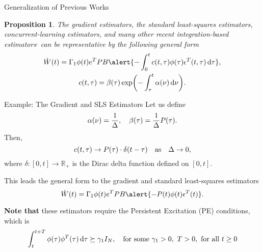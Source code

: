 \documentclass[]{beamer}
\theoremstyle{plain}
\newtheorem{proposition}{Proposition}
\theoremstyle{definition}
\theoremstyle{remark}
\newcommand{\MB}[1]{\mathbb{#1}}
\begin{document}
\begin{frame}{Generalization of Previous Works}
	\begin{proposition}
		The gradient estimators, the standard least-squares
		estimators, concurrent-learning
		estimators, and many other recent
		integration-based estimators$^,$
		 can be representative by the following
		general form
		\begin{gather*}
			\dot{W}(t) = \Gamma_1 \phi(t) e^T P B \alert{- \int_0^t c(t, \tau)
			\phi(\tau) \epsilon^T(t, \tau) \dd{\tau}}, \\
			c(t,\tau) = \beta(\tau) \exp(- \int_\tau^t \alpha(\nu) \dd{\nu}).
		\end{gather*}
	\end{proposition}
\end{frame}

\begin{frame}{Example: The Gradient and SLS Estimators}
	Let us define
	\begin{equation*}
		\alpha(\nu) = \frac{1}{\Delta} \qc \beta(\tau) = \frac{1}{\Delta}
		P(\tau).
	\end{equation*}
	\pause
	Then,
	\begin{equation*}
		c(t, \tau) \to P(\tau) \cdot \delta(t-\tau) \qas \Delta \to 0,
	\end{equation*}
	where $\delta: [0, t] \to \MB{R}_{+}$ is the Dirac delta function defined on
	$[0, t]$.
	\pause

	This leads the general form to the gradient and standard least-squares
	estimators
	\begin{equation*}
		\dot{W}(t) = \Gamma_1 \phi(t) e^T P B \alert{- P(t) \phi(t) \epsilon^T(t)}.
	\end{equation*}

	\textbf{Note that} these estimators require the \alert{Persistent Excitation
	(PE)} conditions, which is
	\begin{equation*}
		\int_t^{t + T} \phi(\tau) \phi^T(\tau) \dd{\tau} \succeq \gamma_1 I_N \qc
		\text{for some } \gamma_1 > 0,\ T > 0,\ \text{for all } t \ge 0
	\end{equation*}
\end{frame}
\end{document}
